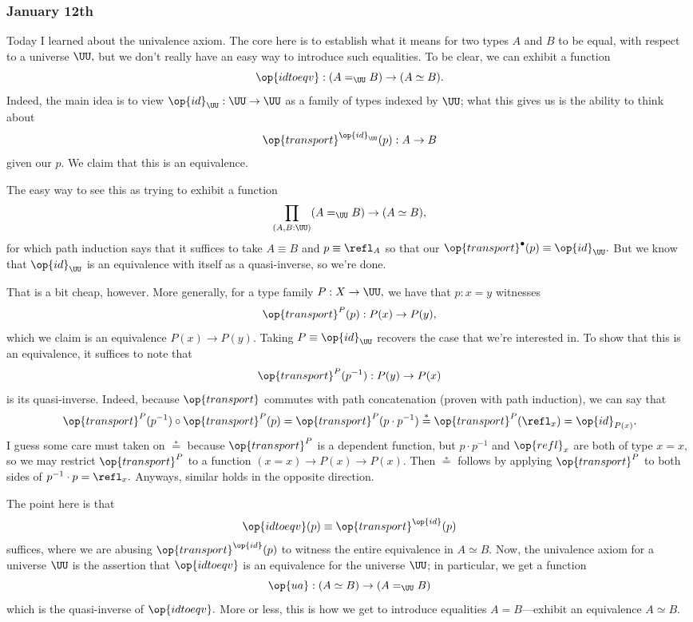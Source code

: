 \subsubsection{January 12th}
Today I learned about the univalence axiom. The core here is to establish what it means for two types $A$ and $B$ to be equal, with respect to a universe $\UU,$ but we don't really have an easy way to introduce such equalities. To be clear, we can exhibit a function
\[\op{idtoeqv}:(A=_\UU B)\to(A\simeq B).\]
Indeed, the main idea is to view $\op{id}_\UU:\UU\to\UU$ as a family of types indexed by $\UU$; what this gives us is the ability to think about
\[\op{transport}^{\op{id}_\UU}(p):A\to B\]
given our $p.$ We claim that this is an equivalence.

The easy way to see this as trying to exhibit a function
\[\prod_{(A,B:\UU)}(A=_\UU B)\to(A\simeq B),\]
for which path induction says that it suffices to take $A\equiv B$ and $p\equiv\refl_A$ so that our $\op{transport}^\bullet(p)\equiv\op{id}_\UU.$ But we know that $\op{id}_\UU$ is an equivalence with itself as a quasi-inverse, so we're done.

That is a bit cheap, however. More generally, for a type family $P:X\to\UU,$ we have that $p:x=y$ witnesses
\[\op{transport}^P(p):P(x)\to P(y),\]
which we claim is an equivalence $P(x)\to P(y).$ Taking $P\equiv\op{id}_\UU$ recovers the case that we're interested in. To show that this is an equivalence, it suffices to note that
\[\op{transport}^P(p^{-1}):P(y)\to P(x)\]
is its quasi-inverse. Indeed, because $\op{transport}$ commutes with path concatenation (proven with path induction), we can say that
\[\op{transport}^P(p^{-1})\circ\op{transport}^P(p)=\op{transport}^P(p\cdot p^{-1})\stackrel*=\op{transport}^P(\refl_x)=\op{id}_{P(x)}.\]
I guess some care must taken on $\stackrel*=$ because $\op{transport}^P$ is a dependent function, but $p\cdot p^{-1}$ and $\op{refl}_x$ are both of type $x=x,$ so we may restrict $\op{transport}^P$ to a function $(x=x)\to P(x)\to P(x).$ Then $\stackrel*=$ follows by applying $\op{transport}^P$ to both sides of $p^{-1}\cdot p=\refl_x.$ Anyways, similar holds in the opposite direction.

The point here is that
\[\op{idtoeqv}(p)\equiv\op{transport}^{\op{id}}(p)\]
suffices, where we are abusing $\op{transport}^{\op{id}}(p)$ to witness the entire equivalence in $A\simeq B.$ Now, the univalence axiom for a universe $\UU$ is the assertion that $\op{idtoeqv}$ is an equivalence for the universe $\UU$; in particular, we get a function
\[\op{ua}:(A\simeq B)\to(A=_\UU B)\]
which is the quasi-inverse of $\op{idtoeqv}.$ More or less, this is how we get to introduce equalities $A=B$---exhibit an equivalence $A\simeq B.$

